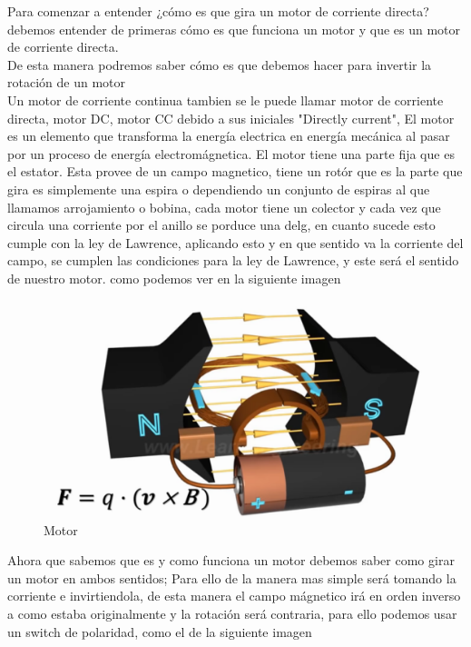\documentclass[letterpaper]{article}
\begin{document}
\begin{large}
Para comenzar a entender ¿cómo es que gira un motor de corriente directa? debemos entender de primeras cómo es que funciona un motor y que es un motor de corriente directa.\\De esta manera podremos saber cómo es que debemos hacer para invertir la rotación de un motor\\
Un motor de corriente continua tambien se le puede llamar motor de corriente directa, motor DC, motor CC debido a sus iniciales "Directly current", El motor es un elemento que transforma la energía electrica en energía mecánica al pasar por un proceso de energía electromágnetica.
El motor tiene una parte fija que es el estator. Esta provee de un campo magnetico, tiene un rotór que es la parte que gira es simplemente una espira o dependiendo un conjunto de espiras al que llamamos arrojamiento o bobina, cada motor tiene un colector y cada vez que circula una corriente por el anillo se porduce una delg, en cuanto sucede esto cumple con la ley de Lawrence, aplicando esto y en que sentido va la corriente del campo, se cumplen las condiciones para la ley de Lawrence, y este será el sentido de nuestro motor. como podemos ver en la siguiente imagen\\

\end{large}
\begin{figure}[hbtp]
\caption{Motor}
\centering
\includegraphics[scale=.2]{motore.png}
\end{figure}
\begin{large}
Ahora que sabemos que es y como funciona un motor debemos saber como girar un motor en ambos sentidos; Para ello de la manera mas simple será tomando la corriente e invirtiendola, de esta manera el campo mágnetico irá en orden inverso a como estaba originalmente y la rotación será contraria, para ello podemos usar un switch de polaridad, como el de la siguiente imagen\\
\end{large}
\end{document}
